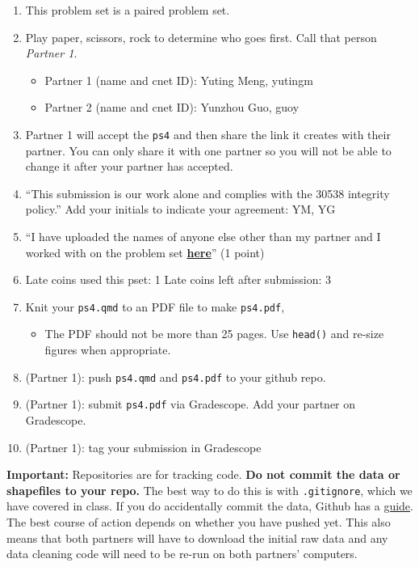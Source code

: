 \documentclass[
  letterpaper,
  DIV=11,
  numbers=noendperiod]{scrartcl}
\providecommand{\tightlist}{%
  \setlength{\itemsep}{0pt}\setlength{\parskip}{0pt}}\usepackage{longtable,booktabs,array}
\begin{document}
\begin{enumerate}
\def\labelenumi{\arabic{enumi}.}
\tightlist
\item
  This problem set is a paired problem set.
\item
  Play paper, scissors, rock to determine who goes first. Call that
  person \emph{Partner 1}.

  \begin{itemize}
  \tightlist
  \item
    Partner 1 (name and cnet ID): Yuting Meng, yutingm
  \item
    Partner 2 (name and cnet ID): Yunzhou Guo, guoy
  \end{itemize}
\item
  Partner 1 will accept the \texttt{ps4} and then share the link it
  creates with their partner. You can only share it with one partner so
  you will not be able to change it after your partner has accepted.
\item
  ``This submission is our work alone and complies with the 30538
  integrity policy.'' Add your initials to indicate your agreement: YM,
  YG
\item
  ``I have uploaded the names of anyone else other than my partner and I
  worked with on the problem set
  \textbf{\href{https://docs.google.com/forms/d/185usrCREQaUbvAXpWhChkjghdGgmAZXA3lPWpXLLsts/edit}{here}}''
  (1 point)
\item
  Late coins used this pset: 1 Late coins left after submission: 3
\item
  Knit your \texttt{ps4.qmd} to an PDF file to make \texttt{ps4.pdf},

  \begin{itemize}
  \tightlist
  \item
    The PDF should not be more than 25 pages. Use \texttt{head()} and
    re-size figures when appropriate.
  \end{itemize}
\item
  (Partner 1): push \texttt{ps4.qmd} and \texttt{ps4.pdf} to your github
  repo.
\item
  (Partner 1): submit \texttt{ps4.pdf} via Gradescope. Add your partner
  on Gradescope.
\item
  (Partner 1): tag your submission in Gradescope
\end{enumerate}

\textbf{Important:} Repositories are for tracking code. \textbf{Do not
commit the data or shapefiles to your repo.} The best way to do this is
with \texttt{.gitignore}, which we have covered in class. If you do
accidentally commit the data, Github has a
\href{https://docs.github.com/en/repositories/working-with-files/managing-large-files/about-large-files-on-github\#removing-files-from-a-repositorys-history}{guide}.
The best course of action depends on whether you have pushed yet. This
also means that both partners will have to download the initial raw data
and any data cleaning code will need to be re-run on both partners'
computers.
\end{document}
